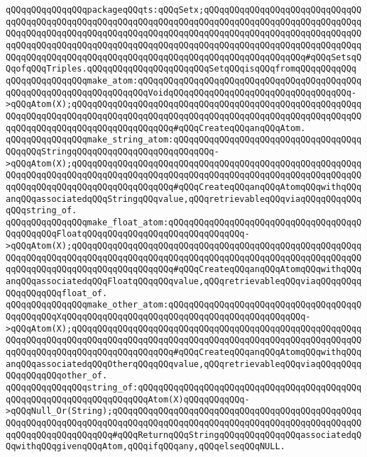 \verb|qQQqqQQqqQQqqQQqpackageqQQqts:qQQqSetx;qQQqqQQqqQQqqQQqqQQqqQQqqQQqqQQqqQQqqQQqqQQqqQQqqQQqqQQqqQQqqQQqqQQqqQQqqQQqqQQqqQQqqQQqqQQqqQQqqQQqqQQqqQQqqQQqqQQqqQQqqQQqqQQqqQQqqQQqqQQqqQQqqQQqqQQqqQQqqQQqqQQqqQQqqQQqqQQqqQQqqQQqqQQqqQQqqQQqqQQqqQQqqQQqqQQqqQQqqQQqqQQqqQQqqQQqqQQqqQQqqQQqqQQqqQQqqQQqqQQqqQQqqQQqqQQqqQQqqQQqqQQqqQQqqQQqqQQqqQQq#qQQqSetsqQQqofqQQqTriples.qQQqqQQqqQQqqQQqqQQqqQQqSetqQQqisqQQqfromqQQqqQQqqQQq|\newline
\newline
\verb|qQQqqQQqqQQqqQQqmake_atom:qQQqqQQqqQQqqQQqqQQqqQQqqQQqqQQqqQQqqQQqqQQqqQQqqQQqqQQqqQQqqQQqqQQqqQQqVoidqQQqqQQqqQQqqQQqqQQqqQQqqQQqqQQqqQQq->qQQqAtom(X);qQQqqQQqqQQqqQQqqQQqqQQqqQQqqQQqqQQqqQQqqQQqqQQqqQQqqQQqqQQqqQQqqQQqqQQqqQQqqQQqqQQqqQQqqQQqqQQqqQQqqQQqqQQqqQQqqQQqqQQqqQQqqQQqqQQqqQQqqQQqqQQqqQQqqQQqqQQqqQQq#qQQqCreateqQQqanqQQqAtom.|\newline
\verb|qQQqqQQqqQQqqQQqmake_string_atom:qQQqqQQqqQQqqQQqqQQqqQQqqQQqqQQqqQQqqQQqqQQqStringqQQqqQQqqQQqqQQqqQQqqQQqqQQq->qQQqAtom(X);qQQqqQQqqQQqqQQqqQQqqQQqqQQqqQQqqQQqqQQqqQQqqQQqqQQqqQQqqQQqqQQqqQQqqQQqqQQqqQQqqQQqqQQqqQQqqQQqqQQqqQQqqQQqqQQqqQQqqQQqqQQqqQQqqQQqqQQqqQQqqQQqqQQqqQQqqQQqqQQq#qQQqCreateqQQqanqQQqAtomqQQqwithqQQqanqQQqassociatedqQQqStringqQQqvalue,qQQqretrievableqQQqviaqQQqqQQqqQQqqQQqstring_of.|\newline
\verb|qQQqqQQqqQQqqQQqmake_float_atom:qQQqqQQqqQQqqQQqqQQqqQQqqQQqqQQqqQQqqQQqqQQqqQQqFloatqQQqqQQqqQQqqQQqqQQqqQQqqQQqqQQq->qQQqAtom(X);qQQqqQQqqQQqqQQqqQQqqQQqqQQqqQQqqQQqqQQqqQQqqQQqqQQqqQQqqQQqqQQqqQQqqQQqqQQqqQQqqQQqqQQqqQQqqQQqqQQqqQQqqQQqqQQqqQQqqQQqqQQqqQQqqQQqqQQqqQQqqQQqqQQqqQQqqQQqqQQq#qQQqCreateqQQqanqQQqAtomqQQqwithqQQqanqQQqassociatedqQQqFloatqQQqqQQqvalue,qQQqretrievableqQQqviaqQQqqQQqqQQqqQQqqQQqfloat_of.|\newline
\verb|qQQqqQQqqQQqqQQqmake_other_atom:qQQqqQQqqQQqqQQqqQQqqQQqqQQqqQQqqQQqqQQqqQQqqQQqXqQQqqQQqqQQqqQQqqQQqqQQqqQQqqQQqqQQqqQQqqQQqqQQq->qQQqAtom(X);qQQqqQQqqQQqqQQqqQQqqQQqqQQqqQQqqQQqqQQqqQQqqQQqqQQqqQQqqQQqqQQqqQQqqQQqqQQqqQQqqQQqqQQqqQQqqQQqqQQqqQQqqQQqqQQqqQQqqQQqqQQqqQQqqQQqqQQqqQQqqQQqqQQqqQQqqQQqqQQq#qQQqCreateqQQqanqQQqAtomqQQqwithqQQqanqQQqassociatedqQQqOtherqQQqqQQqvalue,qQQqretrievableqQQqviaqQQqqQQqqQQqqQQqqQQqother_of.|\newline
\newline
\verb|qQQqqQQqqQQqqQQqstring_of:qQQqqQQqqQQqqQQqqQQqqQQqqQQqqQQqqQQqqQQqqQQqqQQqqQQqqQQqqQQqqQQqqQQqqQQqAtom(X)qQQqqQQqqQQq->qQQqNull_Or(String);qQQqqQQqqQQqqQQqqQQqqQQqqQQqqQQqqQQqqQQqqQQqqQQqqQQqqQQqqQQqqQQqqQQqqQQqqQQqqQQqqQQqqQQqqQQqqQQqqQQqqQQqqQQqqQQqqQQqqQQqqQQqqQQqqQQqqQQqqQQq#qQQqReturnqQQqStringqQQqqQQqqQQqqQQqassociatedqQQqwithqQQqgivenqQQqAtom,qQQqifqQQqany,qQQqelseqQQqNULL.|\newline
